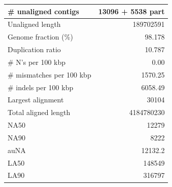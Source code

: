 \documentclass[12pt,a4paper]{article}
\begin{document}
\begin{table}[ht]
\begin{center}
\begin{tabular}{|l*{1}{|r}|}
\# unaligned contigs & 13096 + 5538 part \\ \hline
Unaligned length & 189702591 \\ \hline
Genome fraction (\%) & 98.178 \\ \hline
Duplication ratio & 10.787 \\ \hline
\# N's per 100 kbp & 0.00 \\ \hline
\# mismatches per 100 kbp & 1570.25 \\ \hline
\# indels per 100 kbp & 6058.49 \\ \hline
Largest alignment & 30104 \\ \hline
Total aligned length & 4184780230 \\ \hline
NA50 & 12279 \\ \hline
NA90 & 8222 \\ \hline
auNA & 12132.2 \\ \hline
LA50 & 148549 \\ \hline
LA90 & 316797 \\ \hline
\end{tabular}
\end{center}
\end{table}
\end{document}
